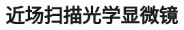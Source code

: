 \documentclass[UTF8]{report}
\theoremstyle{MyLineTheoremStyle} %
\theoremstyle{MyBlockTheoremStyle} %
\theoremstyle{MySubsubsectionStyle} %
\begin{document}
\section{近场扫描光学显微镜}
\end{document}
